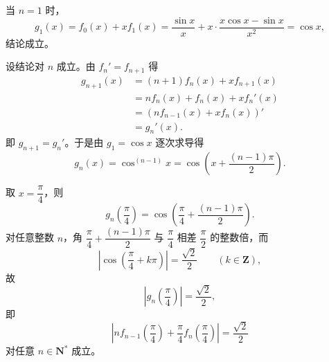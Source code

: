 \begin{answer}
当 $n=1$ 时，
\nopagebreak[4]
\[g_1(x)=f_0(x)+xf_1(x)=\frac{\sin x}x+x\cdot\frac{x\cos x-\sin x}{x^2}=\cos x,\]
结论成立。

设结论对 $n$ 成立。由 $f_n'=f_{n+1}$ 得
\nopagebreak[4]
\[\begin{aligned}
g_{n+1}(x)&=(n+1)f_n(x)+xf_{n+1}(x)\\
&=nf_n(x)+f_n(x)+xf_n'(x)\\
&=\left(nf_{n-1}(x)+xf_n(x)\right)'\\
&=g_n'(x).
\end{aligned}\]
即 $g_{n+1}=g_n'$。于是由 $g_1=\cos x$ 逐次求导得
\nopagebreak[4]
\[g_n(x)=\cos^{(n-1)}x=\cos\left(x+\frac{(n-1)\pi}2\right).\]

取 $x=\dfrac\pi4$，则
\nopagebreak[4]
\[g_n\left(\frac\pi4\right)=\cos\left(\frac\pi4+\frac{(n-1)\pi}2\right).\]
对任意整数 $n$，角 $\dfrac\pi4+\dfrac{(n-1)\pi}2$ 与 $\dfrac\pi4$ 相差 $\dfrac\pi2$ 的整数倍，而
\nopagebreak[4]
\[\left|\cos\left(\frac\pi4+k\pi\right)\right|=\frac{\sqrt2}2\qquad(k\in\mathbf Z),\]
故
\nopagebreak[4]
\[\left|g_n\left(\frac\pi4\right)\right|=\frac{\sqrt2}2,\]
即
\nopagebreak[4]
\[\left|nf_{n-1}\left(\frac\pi4\right)+\frac\pi4f_n\left(\frac\pi4\right)\right|=\frac{\sqrt2}2\]
对任意 $n\in\mathbf N^*$ 成立。



\end{answer}